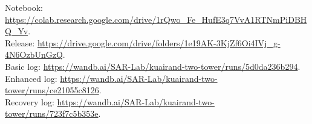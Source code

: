 \documentclass[11pt,a4paper]{article}
\begin{document}
Notebook: \url{https://colab.research.google.com/drive/1rQwo_Fe_HufE3q7VvA1RTNmPiDBHQ_Yv}.\\
Release: \url{https://drive.google.com/drive/folders/1e19AK-3KjZf6Oi4IVj_g-4N6OzbUnGzQ}.\\
Basic log: \url{https://wandb.ai/SAR-Lab/kuairand-two-tower/runs/5d0da236b294}.\\
Enhanced log: \url{https://wandb.ai/SAR-Lab/kuairand-two-tower/runs/ce21055c8126}.\\
Recovery log: \url{https://wandb.ai/SAR-Lab/kuairand-two-tower/runs/723f7c5b353e}.
\end{document}
